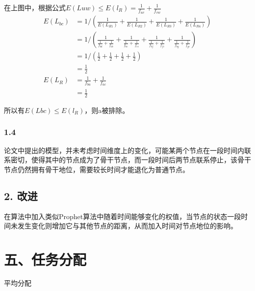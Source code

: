 \documentclass[lang=cn,11pt]{elegantpaper}
\begin{document}
		在上图中，根据公式$E(L{uw})\le E(l_R)=\frac{1}{f_{uv}}+\frac{1}{f_{vw}}$
		 $$
		\begin{align}
		E(L_{bc})&=1/(\frac{1}{E(L_{R1})}+\frac{1}{E(L_{R2})}+\frac{1}{E(L_{R3})}+\frac{1}{E(L_{R4})})\\
		&=1/(\frac{1}{\frac{1}{f_{bd}}+\frac{1}{f_{dc}}} + \frac{1}{\frac{1}{f_{be}}+\frac{1}{f_{ec}}} + \frac{1}{\frac{1}{f_{bf}}+\frac{1}{f_{fc}}} + \frac{1}{\frac{1}{f_{bg}}+\frac{1}{f_{gc}}})\\
		&=1/(\frac{1}{2} + \frac{1}{2} + \frac{1}{2} + \frac{1}{2})\\
		&=\frac{1}{2}\\
		E(L_R)&=\frac{1}{f_{ba}} + \frac{1}{f_{ac}}\\
		&=\frac{1}{2}
		\end{align}
		$$
		
		所以有$E(L{bc})\le E(l_R)$，则a被排除。
		
	\subsubsection*{1.4}
	论文中提出的模型，并未考虑时间维度上的变化，可能某两个节点在一段时间内联系密切，使得其中的节点成为了骨干节点，而一段时间后两节点联系停止，该骨干节点仍然拥有骨干地位，需要较长时间才能退化为普通节点。
	
	\subsection*{2. 改进}
	
	在算法中加入类似Prophet算法中随着时间能够变化的权值，当节点的状态一段时间未发生变化则增加它与其他节点的距离，从而加入时间对节点地位的影响。
	

%

\section*{五、任务分配}

	平均分配
\end{document}
